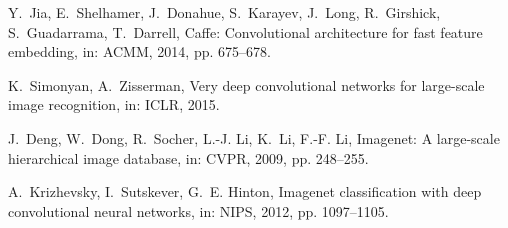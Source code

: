 \documentclass[preprint,5p,times,twocolumn]{elsarticle}
\begin{document}
\begin{thebibliography}{}
Y.~Jia, E.~Shelhamer, J.~Donahue, S.~Karayev, J.~Long, R.~Girshick,
  S.~Guadarrama, T.~Darrell, Caffe: Convolutional architecture for fast feature
  embedding, in: ACMM, 2014, pp. 675--678.

K.~Simonyan, A.~Zisserman, Very deep convolutional networks for large-scale
  image recognition, in: ICLR, 2015.

J.~Deng, W.~Dong, R.~Socher, L.-J. Li, K.~Li, F.-F. Li, Imagenet: A large-scale
  hierarchical image database, in: CVPR, 2009, pp. 248--255.

A.~Krizhevsky, I.~Sutskever, G.~E. Hinton, Imagenet classification with deep
  convolutional neural networks, in: NIPS, 2012, pp. 1097--1105.

\end{thebibliography}
\end{document}
